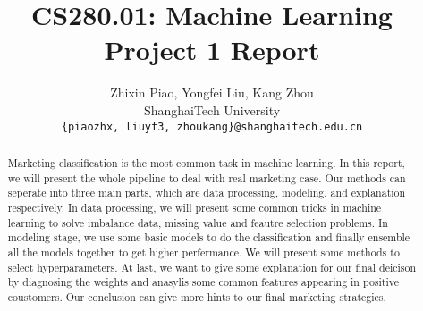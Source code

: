 \documentclass[10pt,twocolumn,letterpaper]{article}
\begin{document}
\title{CS280.01: Machine Learning\\ Project 1 Report}

\author{Zhixin Piao, Yongfei Liu, Kang Zhou\\
ShanghaiTech University\\
{\tt\small { \{piaozhx, liuyf3, zhoukang\}@shanghaitech.edu.cn}
}}




\maketitle

\begin{abstract}
   Marketing classification is the most common task in machine learning. In this report, we will present the whole pipeline to deal with real marketing case. Our methods can seperate into three main parts, which are data processing, modeling, and explanation respectively. In data processing, we will present some common tricks in machine learning to solve imbalance data, missing value and feautre selection problems. In modeling stage, we use some basic models to do the classification and finally ensemble all the models together to get higher perfermance. We will present some methods to select hyperparameters. At last, we want to give some explanation for our final deicison by diagnosing the weights and anasylis some common features appearing in positive coustomers. Our conclusion can give more hints to our final marketing strategies.
\end{abstract}








{\small


}
\end{document}
